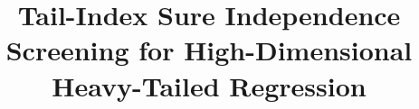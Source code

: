 \documentclass[bj,authoryear]{imsart}
\theoremstyle{plain}
\begin{document}
\begin{frontmatter}
\title{Tail-Index Sure Independence Screening for
High-Dimensional Heavy-Tailed Regression}

\begin{aug}
\author[A]{~}
\author[B]{~}
\address[A]{ENSAI and IRMAR (UMR CNRS 6625), Universit\'e de Rennes}
\address[B]{LISN, Universit\'e Paris-Saclay, CNRS}
\end{aug}


\end{frontmatter}
\end{document}
